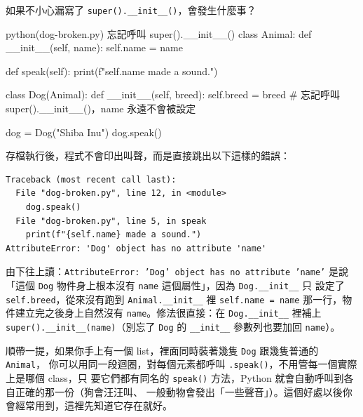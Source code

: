 
如果不小心漏寫了 \texttt{super().\_\_init\_\_()}，會發生什麼事？

\begin{example}{python}{(dog-broken.py) 忘記呼叫 super().\_\_init\_\_()}
class Animal:
    def __init__(self, name):
        self.name = name

    def speak(self):
        print(f"{self.name} made a sound.")


class Dog(Animal):
    def __init__(self, breed):
        self.breed = breed  # 忘記呼叫 super().__init__()，name 永遠不會被設定


dog = Dog("Shiba Inu")
dog.speak()
\end{example}

存檔執行後，程式不會印出叫聲，而是直接跳出以下這樣的錯誤：

\begin{verbatim}
Traceback (most recent call last):
  File "dog-broken.py", line 12, in <module>
    dog.speak()
  File "dog-broken.py", line 5, in speak
    print(f"{self.name} made a sound.")
AttributeError: 'Dog' object has no attribute 'name'
\end{verbatim}

由下往上讀：\texttt{AttributeError: 'Dog' object has no attribute 'name'} 是說「這個
\texttt{Dog} 物件身上根本沒有 \texttt{name} 這個屬性」，因為 \texttt{Dog.\_\_init\_\_} 只
設定了 \texttt{self.breed}，從來沒有跑到 \texttt{Animal.\_\_init\_\_} 裡
\texttt{self.name = name} 那一行，物件建立完之後身上自然沒有 \texttt{name}。修法很直接：在
\texttt{Dog.\_\_init\_\_} 裡補上 \texttt{super().\_\_init\_\_(name)}（別忘了 \texttt{Dog}
的 \texttt{\_\_init\_\_} 參數列也要加回 \texttt{name}）。

順帶一提，如果你手上有一個 list，裡面同時裝著幾隻 \texttt{Dog} 跟幾隻普通的 \texttt{Animal}，
你可以用同一段迴圈，對每個元素都呼叫 \texttt{.speak()}，不用管每一個實際上是哪個 class，只
要它們都有同名的 \texttt{speak()} 方法，Python 就會自動呼叫到各自正確的那一份（狗會汪汪叫、
一般動物會發出「一些聲音」）。這個好處以後你會經常用到，這裡先知道它存在就好。

